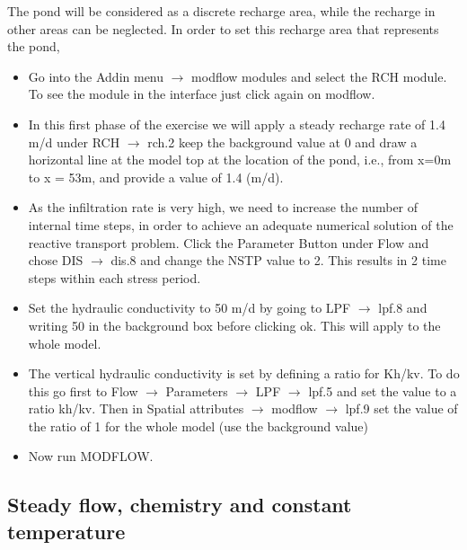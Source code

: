 The pond will be considered as a discrete recharge area, while the recharge 
in other areas can be neglected. 
In order to set this recharge area that represents the pond, 

\begin{itemize}
\item Go into the {\color{blue}Addin menu} $\rightarrow$ {\color{blue}modflow modules} 
and select the {\color{blue}RCH} module. To see the module in the interface just click again on modflow. 

\item In this first phase of the exercise we will apply a steady recharge 
rate of 1.4 m/d under {\color{blue}RCH} $\rightarrow$ {\color{blue}rch.2} 
keep the background value at 0 and draw a horizontal line at the model 
top at the location of the pond, i.e., from x=0m to x = 53m, and provide 
a value of 1.4 (m/d). 

\item As the infiltration rate is very high, 
we need to increase the number of internal time steps, 
in order to achieve an adequate numerical solution of the reactive transport problem. 
Click the {\color{blue}Parameter} Button under {\color{blue}Flow} 
and chose {\color{blue}DIS} $\rightarrow$ {\color{blue}dis.8} 
and change the {\color{blue}NSTP} value to 2. 
This results in 2 time steps within each stress period. 

\item Set the hydraulic conductivity to 50 m/d by going to {\color{blue}LPF} $\rightarrow$ {\color{blue}lpf.8} 
and writing 50 in the background box before clicking {\color{blue}ok}. 
This will apply to the whole model. 

\item The vertical hydraulic conductivity 
is set by defining a ratio for Kh/kv. 
To do this go first to {\color{blue}Flow} $\rightarrow$ 
{\color{blue}Parameters} $\rightarrow$ {\color{blue}LPF} $\rightarrow$ {\color{blue}lpf.5} 
and set the value to a ratio kh/kv. 
Then in {\color{blue}Spatial attributes} $\rightarrow$ {\color{blue}modflow} $\rightarrow$ {\color{blue}lpf.9} 
set the value of the ratio of 1 for the whole model (use the background value)

\item Now run MODFLOW.

\end{itemize}

\subsection[Steady flow, chemistry and constant temperature]
{Steady flow, chemistry and constant temperature}

